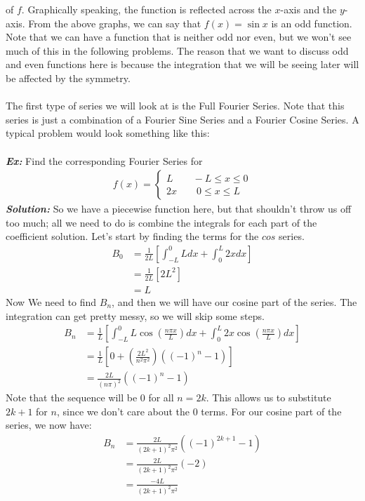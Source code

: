 \documentclass{article}
\begin{document}
of $f$. Graphically speaking, the function is reflected across the $x$-axis and
the $y$-axis. From the above graphs, we can say that $f(x) = \sin{x}$ is an odd
function. Note that we can have a function that is neither odd nor even, but we
won't see much of this in the following problems. The reason that we want to
discuss odd and even functions here is because the integration that we will be
seeing later will be affected by the symmetry.\\\\
\indent The first type of series we will look at is the Full Fourier Series.
Note that this series is just a combination of a Fourier Sine Series and a
Fourier Cosine Series. A typical problem would look something like this:\\\\
\textbf{\textit{Ex:}} Find the corresponding Fourier Series for
\begin{gather*}
f(x)=
\begin{cases*}
L \qquad -L \leq x \leq 0\\
2x \qquad 0 \leq x \leq L
\end{cases*}
\end{gather*}
\indent \textbf{\textit{Solution:}} So we have a piecewise function here, but
that shouldn't throw us off too much; all we need to do is combine the integrals
for each part of the coefficient solution. Let's start by finding the terms for
the $cos$ series.
\begin{align*}
B_{0} &= \frac{1}{2L}\left[\int_{-L}^{0}Ldx + \int_{0}^{L}2xdx\right]\\
&= \frac{1}{2L}[2L^{2}]\\
&= L
\end{align*}
\noindent Now We need to find $B_{n}$, and then we will have our cosine part of
the series. The integration can get pretty messy, so we will skip some steps.
\begin{align*}
B_{n} &= \frac{1}{L}\left[\int_{-L}^{0}L\cos{\left(\frac{n\pi x}{L}\right)}dx + \int_{0}^{L}2x\cos{\left(\frac{n\pi x}{L}\right)}dx\right]\\
&= \frac{1}{L}\left[0 + \left(\frac{2L^{2}}{n^{2}\pi^{2}}\right)((-1)^{n} - 1)\right]\\
&= \frac{2L}{(n\pi)^{2}}((-1)^{n} - 1)
\end{align*}
\noindent Note that the sequence will be 0 for all $n = 2k$. This allows us to
substitute $2k+1$ for $n$, since we don't care about the $0$ terms. For our
cosine part of the series, we now have:
\begin{align*}
B_{n} &= \frac{2L}{(2k+1)^{2}\pi^{2}}((-1)^{2k+1}-1)\\
&= \frac{2L}{(2k+1)^{2}\pi^{2}}(-2)\\
&= \frac{-4L}{(2k+1)^{2}\pi^{2}}
\end{align*}
\end{document}
